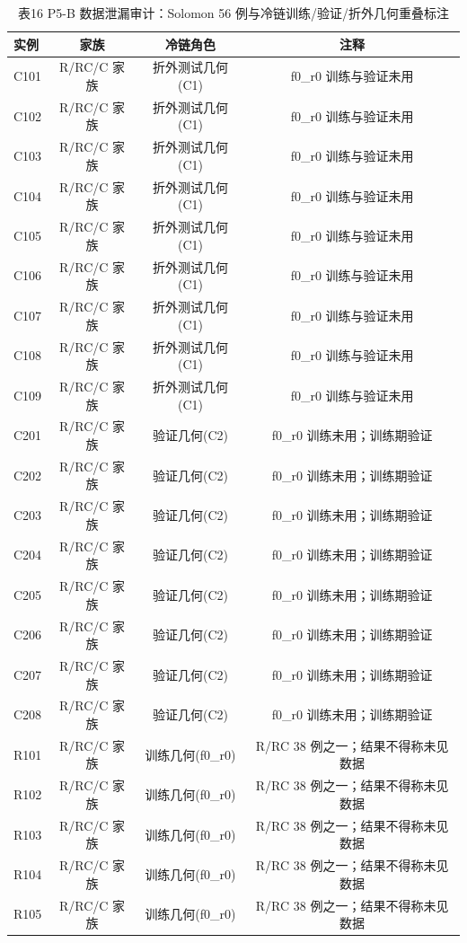 \begin{table}[htbp]
\centering
\caption{表16 P5-B 数据泄漏审计：Solomon 56 例与冷链训练/验证/折外几何重叠标注}
\label{tab:p5_16}
\begin{tabular}{lccc}
\toprule
实例 & 家族 & 冷链角色 & 注释 \\
\midrule
C101 & R/RC/C 家族 & 折外测试几何(C1) & f0_r0 训练与验证未用 \\
C102 & R/RC/C 家族 & 折外测试几何(C1) & f0_r0 训练与验证未用 \\
C103 & R/RC/C 家族 & 折外测试几何(C1) & f0_r0 训练与验证未用 \\
C104 & R/RC/C 家族 & 折外测试几何(C1) & f0_r0 训练与验证未用 \\
C105 & R/RC/C 家族 & 折外测试几何(C1) & f0_r0 训练与验证未用 \\
C106 & R/RC/C 家族 & 折外测试几何(C1) & f0_r0 训练与验证未用 \\
C107 & R/RC/C 家族 & 折外测试几何(C1) & f0_r0 训练与验证未用 \\
C108 & R/RC/C 家族 & 折外测试几何(C1) & f0_r0 训练与验证未用 \\
C109 & R/RC/C 家族 & 折外测试几何(C1) & f0_r0 训练与验证未用 \\
C201 & R/RC/C 家族 & 验证几何(C2) & f0_r0 训练未用；训练期验证 \\
C202 & R/RC/C 家族 & 验证几何(C2) & f0_r0 训练未用；训练期验证 \\
C203 & R/RC/C 家族 & 验证几何(C2) & f0_r0 训练未用；训练期验证 \\
C204 & R/RC/C 家族 & 验证几何(C2) & f0_r0 训练未用；训练期验证 \\
C205 & R/RC/C 家族 & 验证几何(C2) & f0_r0 训练未用；训练期验证 \\
C206 & R/RC/C 家族 & 验证几何(C2) & f0_r0 训练未用；训练期验证 \\
C207 & R/RC/C 家族 & 验证几何(C2) & f0_r0 训练未用；训练期验证 \\
C208 & R/RC/C 家族 & 验证几何(C2) & f0_r0 训练未用；训练期验证 \\
R101 & R/RC/C 家族 & 训练几何(f0_r0) & R/RC 38 例之一；结果不得称未见数据 \\
R102 & R/RC/C 家族 & 训练几何(f0_r0) & R/RC 38 例之一；结果不得称未见数据 \\
R103 & R/RC/C 家族 & 训练几何(f0_r0) & R/RC 38 例之一；结果不得称未见数据 \\
R104 & R/RC/C 家族 & 训练几何(f0_r0) & R/RC 38 例之一；结果不得称未见数据 \\
R105 & R/RC/C 家族 & 训练几何(f0_r0) & R/RC 38 例之一；结果不得称未见数据 \\

\end{tabular}
\end{table}
